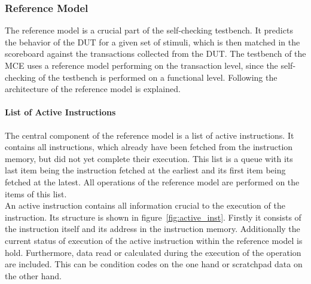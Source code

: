 \subsubsection{Reference Model}

The reference model is a crucial part of the self-checking testbench. 
It predicts the behavior of the DUT for a given set of stimuli, which is then matched in the scoreboard against the transactions collected from the DUT.
The testbench of the MCE uses a reference model performing on the transaction level, since the self-checking of the testbench is performed on a functional level.
Following the architecture of the reference model is explained.

\paragraph{List of Active Instructions}

The central component of the reference model is a list of active instructions.
It contains all instructions, which already have been fetched from the instruction memory, but did not yet complete their execution.
This list is a queue with its last item being the instruction fetched at the earliest and its first item being fetched at the latest.
All operations of the reference model are performed on the items of this list.\\
An active instruction contains all information crucial to the execution of the instruction.
Its structure is shown in figure~\ref{fig:active_inst}.
Firstly it consists of the instruction itself and its address in the instruction memory.
Additionally the current status of execution of the active instruction within the reference model is hold.
Furthermore, data read or calculated during the execution of the operation are included.
This can be condition codes on the one hand or scratchpad data on the other hand.

